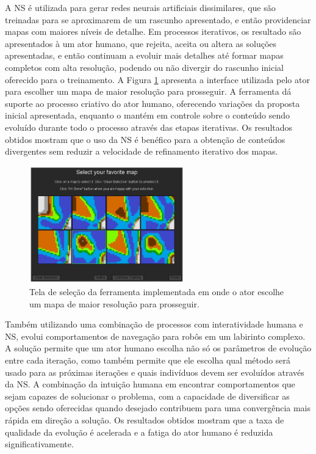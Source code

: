 A NS é utilizada para gerar redes neurais artificiais dissimilares, que são treinadas para se aproximarem de um rascunho apresentado, e então providenciar mapas com maiores níveis de detalhe. Em processos iterativos, os resultado são apresentados à um ator humano, que rejeita, aceita ou altera as soluções apresentadas, e então continuam a evoluir mais detalhes até formar mapas completos com alta resolução, podendo ou não divergir do rascunho inicial oferecido para o treinamento. A Figura \ref{fig:liapis2013sentient} apresenta a interface utilizada pelo ator para escolher um mapa de maior resolução para prosseguir. A ferramenta dá suporte ao processo criativo do ator humano, oferecendo variações da proposta inicial apresentada, enquanto o mantém em controle sobre o conteúdo sendo evoluído durante todo o processo através das etapas iterativas. Os resultados obtidos mostram que o uso da NS é benéfico para a obtenção de conteúdos divergentes sem reduzir a velocidade de refinamento iterativo dos mapas.

\begin{figure}[htb]
	\begin{center}
		\includegraphics[width=0.6\textwidth]{Imagens/liapis2013sentient.jpg}
		\caption{Tela de seleção da ferramenta implementada em \cite{liapis2013sentient} onde o ator escolhe um mapa de maior resolução para prosseguir.}
		\label{fig:liapis2013sentient}
	\end{center}
\end{figure}

Também utilizando uma combinação de processos com interatividade humana e NS, \cite{woolley2014novel} evolui comportamentos de navegação para robôs em um labirinto complexo. A solução permite que um ator humano escolha não só os parâmetros de evolução entre cada iteração, como também permite que ele escolha qual método será usado para as próximas iterações e quais indivíduos devem ser evoluídos através da NS. A combinação da intuição humana em encontrar comportamentos que sejam capazes de solucionar o problema, com a capacidade de diversificar as opções sendo oferecidas quando desejado contribuem para uma convergência mais rápida em direção a solução. Os resultados obtidos mostram que a taxa de qualidade da evolução é acelerada e a fatiga do ator humano é reduzida significativamente.

